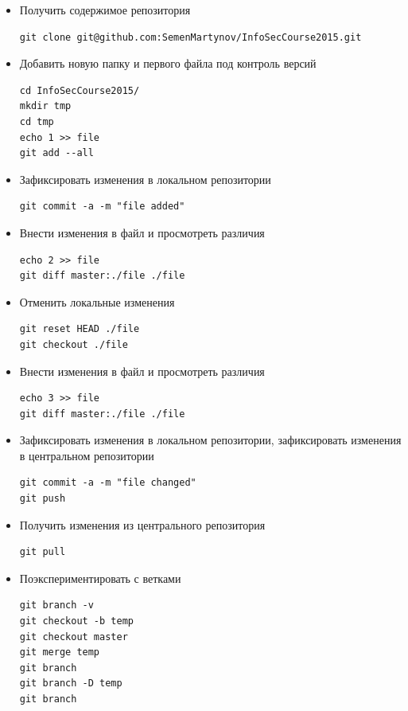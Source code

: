 \documentclass[a4paper, 12pt]{article}		%
\begin{document}
\begin{itemize}

\item{Получить содержимое репозитория
\begin{verbatim}git clone git@github.com:SemenMartynov/InfoSecCourse2015.git
\end{verbatim}}

\item{Добавить новую папку и первого файла под контроль версий
\begin{verbatim}cd InfoSecCourse2015/
mkdir tmp
cd tmp
echo 1 >> file
git add --all
\end{verbatim}}

\item{Зафиксировать изменения в локальном репозитории
\begin{verbatim}git commit -a -m "file added"
\end{verbatim}}

\item{Внести изменения в файл и просмотреть различия
\begin{verbatim}echo 2 >> file
git diff master:./file ./file
\end{verbatim}}

\item{Отменить локальные изменения
\begin{verbatim}git reset HEAD ./file
git checkout ./file
\end{verbatim}}

\item{Внести изменения в файл и просмотреть различия
\begin{verbatim}echo 3 >> file
git diff master:./file ./file
\end{verbatim}}

\item{Зафиксировать изменения в локальном репозитории, зафиксировать изменения в центральном репозитории
\begin{verbatim}git commit -a -m "file changed"
git push
\end{verbatim}}

\item{Получить изменения из центрального репозитория
\begin{verbatim}git pull
\end{verbatim}}

\item{Поэкспериментировать с ветками
\begin{verbatim}git branch -v
git checkout -b temp
git checkout master
git merge temp
git branch
git branch -D temp
git branch
\end{verbatim}}

\end{itemize}
\end{document}
